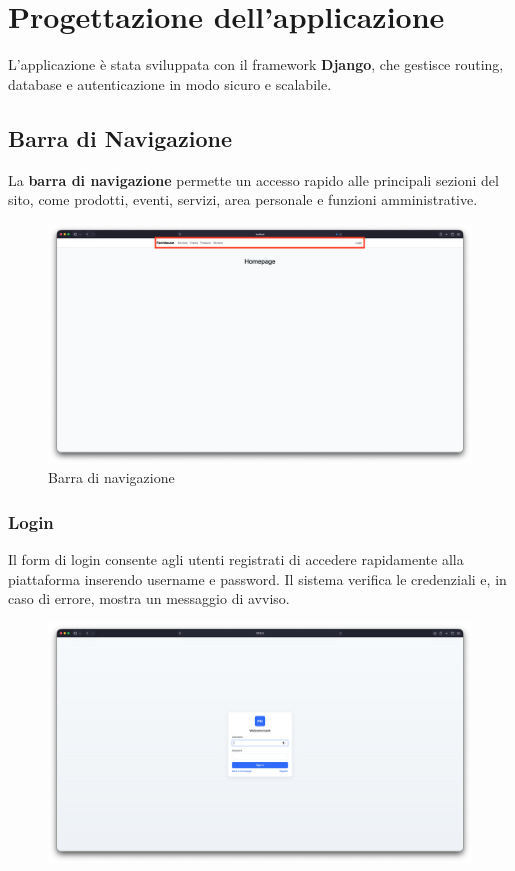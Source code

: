 \documentclass[a4paper,12pt]{report}
\begin{document}
\chapter{Progettazione dell'applicazione}
L'applicazione è stata sviluppata con il framework \textbf{Django},
che gestisce routing,
database e autenticazione in modo sicuro e scalabile.

\section{Barra di Navigazione}
La \textbf{barra di navigazione} permette un accesso rapido alle
principali sezioni del sito,
come prodotti, eventi, servizi, area personale e funzioni amministrative.

\begin{figure}[H]
  \centering
  \includegraphics[width=\textwidth, trim=0 0 0 0]{./img/navbar.png}
  \caption{Barra di navigazione}
  \label{fig:navbar}
\end{figure}

\newpage
\subsection*{Login}

Il form di login consente agli utenti registrati di accedere
rapidamente alla piattaforma inserendo username e
password. Il sistema verifica le credenziali e, in caso di errore,
mostra un messaggio di avviso.

\begin{figure}[H]
  \centering
  \includegraphics[width=\textwidth, trim=0 0 0 0]{./img/login.png}
  \vspace{-1em}
  \label{fig:login}
\end{figure}
\end{document}
